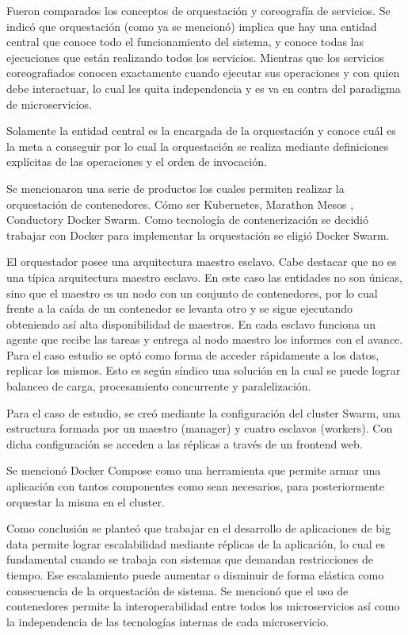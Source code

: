 Fueron comparados los conceptos de orquestación y coreografía de servicios. Se indicó que orquestación (como ya se mencionó) implica que hay una entidad central que conoce todo el funcionamiento del sistema, y conoce todas las ejecuciones que están realizando todos los servicios.
Mientras que los servicios coreografiados conocen exactamente cuando ejecutar sus operaciones y con quien debe interactuar, lo cual les quita independencia y es va en contra del paradigma de microservicios.


Solamente la entidad central es la encargada de la orquestación y conoce cuál es la meta a conseguir por lo cual la orquestación se realiza mediante definiciones explícitas de las operaciones y el orden de invocación.

Se mencionaron una serie de productos los cuales permiten realizar la orquestación de contenedores.
Cómo ser Kubernetes, Marathon Mesos \cite{matathonMesos}, Conductor\cite{conductor}y Docker Swarm\cite{dockerSwarm}.
Como tecnología de contenerización se decidió trabajar con Docker para implementar la orquestación se eligió  Docker Swarm.


El orquestador posee una arquitectura maestro esclavo. Cabe destacar que no es una típica arquitectura maestro esclavo. En este caso las entidades no son únicas, sino que el maestro es un nodo con un conjunto de contenedores, por lo cual frente a la caída de un contenedor se levanta otro y se sigue ejecutando obteniendo así alta disponibilidad de maestros.
En cada esclavo funciona un agente que recibe las tareas y entrega al nodo maestro los informes con el avance.
Para el caso estudio se optó como forma de acceder rápidamente a los datos, replicar los mismos.
Esto es según síndico una solución en la cual se puede lograr balanceo de carga, procesamiento concurrente y paralelización.


Para el caso de estudio, se creó mediante la configuración del cluster Swarm, una estructura formada por un maestro (manager) y cuatro esclavos (workers).
Con dicha configuración se acceden a las réplicas a través de un frontend web.

Se mencionó Docker Compose\cite{dockerCompose} como una herramienta que permite armar una aplicación con tantos componentes como sean necesarios, para posteriormente orquestar la misma en el cluster.


Como conclusión se planteó que trabajar en el desarrollo de aplicaciones de big data permite lograr escalabilidad mediante réplicas de la aplicación, lo cual es fundamental cuando se trabaja con sistemas que demandan restricciones de tiempo.
Ese escalamiento puede aumentar o disminuir de forma elástica como consecuencia de la orquestación de sistema.
Se mencionó que el uso de contenedores permite la interoperabilidad entre todos los microservicios así como la independencia de las tecnologías internas de cada microservicio.

